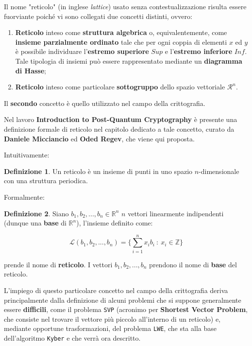 \documentclass[a4paper, 12pt, oneside]{article}
\theoremstyle{definition}
\newtheorem{definition}{Definizione}
\begin{document}
Il nome "reticolo" (in inglese \textit{lattice}) usato senza contestualizzazione risulta essere fuorviante poiché vi sono collegati due concetti distinti, ovvero:

\begin{enumerate}
    \item \textbf{Reticolo} inteso come \textbf{struttura algebrica} o, equivalentemente, come \textbf{insieme parzialmente ordinato} tale che per ogni coppia di elementi $x$ ed $y$ è possibile individuare l'\textbf{estremo superiore} $Sup$ e l'\textbf{estremo inferiore} $Inf$. Tale tipologia di insiemi può essere rappresentato mediante un \textbf{diagramma di Hasse};
    \item \textbf{Reticolo} inteso come particolare \textbf{sottogruppo} dello spazio vettoriale $\mathcal{R}^n$.
\end{enumerate}

Il \textbf{secondo} concetto è quello utilizzato nel campo della crittografia.

Nel lavoro \textbf{Introduction to Post-Quantum Cryptography} \cite{Bernstein2009} è presente una definizione formale di reticolo nel capitolo dedicato a tale concetto, curato da \textbf{Daniele Micciancio} ed \textbf{Oded Regev}, che viene qui proposta.

Intuitivamente:
\begin{definition}
    Un reticolo è un insieme di punti in uno spazio $n$-dimensionale con una struttura periodica.
\end{definition}

Formalmente:

\begin{definition}
    Siano $b_1, b_2, ..., b_n \in \mathbb{R} ^n$ $n$ vettori linearmente indipendenti (dunque una \textbf{base} di $\mathbb{R}^n$), l'insieme definito come:

    \begin{center}
        \[\mathcal{L}(b_1,b_2,...,b_n) = \Biggl \{ \sum_{i = 1}^{n}x_ib_i \: : \: x_i \in \mathbb{Z} \Biggl\}\]
    \end{center}

    prende il nome di \textbf{reticolo}. I vettori $b_1, b_2, ..., b_n$ prendono il nome di \textbf{base} del reticolo.
\end{definition}

L'impiego di questo particolare concetto nel campo della crittografia deriva principalmente dalla definizione di alcuni problemi che si suppone generalmente essere \textbf{difficili}, come il problema \texttt{SVP} (acronimo per \textbf{Shortest Vector Problem}, che consiste nel trovare il vettore più piccolo all'interno di un reticolo) e, mediante opportune trasformazioni, del problema \texttt{LWE}, che sta alla base dell'algoritmo \texttt{Kyber} e che verrà ora descritto.
\end{document}
